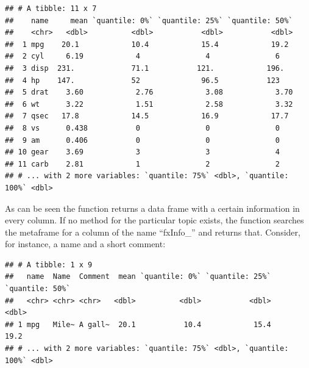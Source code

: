 \documentclass[]{report}
\newenvironment{Shaded}{\begin{snugshade}}{\end{snugshade}}
\newcommand{\KeywordTok}[1]{\textcolor[rgb]{0.13,0.29,0.53}{\textbf{#1}}}
\newcommand{\DataTypeTok}[1]{\textcolor[rgb]{0.13,0.29,0.53}{#1}}
\newcommand{\StringTok}[1]{\textcolor[rgb]{0.31,0.60,0.02}{#1}}
\newcommand{\OperatorTok}[1]{\textcolor[rgb]{0.81,0.36,0.00}{\textbf{#1}}}
\newcommand{\NormalTok}[1]{#1}
\theoremstyle{definition}
\theoremstyle{definition}
\theoremstyle{definition}
\theoremstyle{remark}
\begin{document}
\begin{verbatim}
## # A tibble: 11 x 7
##    name     mean `quantile: 0%` `quantile: 25%` `quantile: 50%`
##    <chr>   <dbl>          <dbl>           <dbl>           <dbl>
##  1 mpg    20.1            10.4            15.4            19.2 
##  2 cyl     6.19            4               4               6   
##  3 disp  231.             71.1           121.            196.  
##  4 hp    147.             52              96.5           123   
##  5 drat    3.60            2.76            3.08            3.70
##  6 wt      3.22            1.51            2.58            3.32
##  7 qsec   17.8            14.5            16.9            17.7 
##  8 vs      0.438           0               0               0   
##  9 am      0.406           0               0               0   
## 10 gear    3.69            3               3               4   
## 11 carb    2.81            1               2               2   
## # ... with 2 more variables: `quantile: 75%` <dbl>, `quantile: 100%` <dbl>
\end{verbatim}

As can be seen the function returns a data frame with a certain
information in every column. If no method for the particular topic
exists, the function searches the metaframe for a column of the name
``fxInfo\_'' and returns that. Consider, for instance, a name and a
short comment:

\begin{Shaded}
\end{Shaded}

\begin{verbatim}
## # A tibble: 1 x 9
##   name  Name  Comment  mean `quantile: 0%` `quantile: 25%` `quantile: 50%`
##   <chr> <chr> <chr>   <dbl>          <dbl>           <dbl>           <dbl>
## 1 mpg   Mile~ A gall~  20.1           10.4            15.4            19.2
## # ... with 2 more variables: `quantile: 75%` <dbl>, `quantile: 100%` <dbl>
\end{verbatim}
\end{document}
